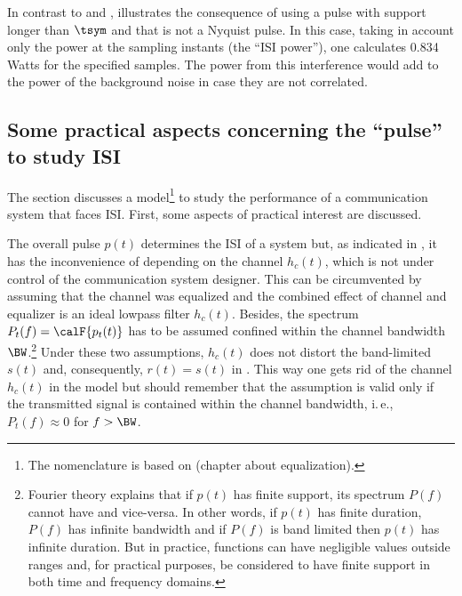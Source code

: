 In contrast to  and ,  illustrates the consequence of using a pulse with support longer than $\tsym$ and that is not a Nyquist pulse.
In this case, taking in account only the power at the sampling instants (the ``ISI power''), one calculates 0.834 Watts for the specified samples. The power from this interference would add to the power of the background noise in case they are not correlated. 
\eExample 

\subsection{Some practical aspects concerning the ``pulse'' to study ISI}
\label{sec:isiOtherModels}

The section discusses a model\footnote{The nomenclature is based on \cite{Ciofficn} (chapter about
equalization).} to study the performance of a communication system that faces ISI.
First, some aspects of practical interest are discussed.


The overall pulse $p(t)$ determines the ISI of a system but, as indicated in 
, it  has the inconvenience of depending on the channel $h_c(t)$,
which is not under control of the communication system designer.
This can be circumvented by assuming that the channel was equalized and the combined effect of channel and equalizer is an ideal lowpass filter $h_c(t)$. Besides, the spectrum $P_t(f) = \calF \{p_t(t)\}$ has to be assumed confined within the channel bandwidth $\BW$.\footnote{Fourier theory explains that if $p(t)$ has finite support, its spectrum $P(f)$ cannot have and vice-versa. In other words, if $p(t)$ has finite duration, $P(f)$ has infinite bandwidth and if $P(f)$ is band limited then $p(t)$ has infinite duration. But in practice, functions can have negligible values outside ranges and, for practical purposes, be considered to have finite support in both time and frequency domains.} Under these two assumptions, $h_c(t)$ does not distort the band-limited $s(t)$ and, consequently, $r(t)=s(t)$ in . This way one gets rid of the channel $h_c(t)$ in the model but should remember that the assumption is valid only if the transmitted signal is contained within the channel bandwidth, i.\,e., $P_t(f) \approx 0$ for $f > \BW$.



